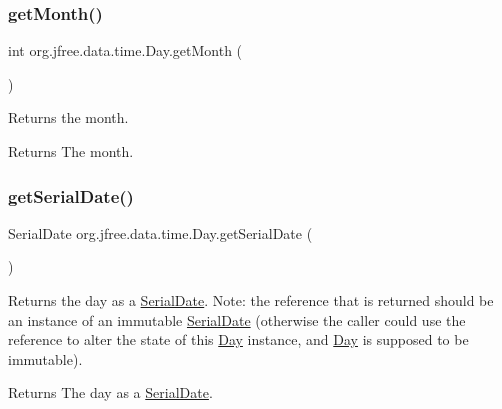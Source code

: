 \subsubsection{\texorpdfstring{get\+Month()}{getMonth()}}
{\footnotesize\ttfamily int org.\+jfree.\+data.\+time.\+Day.\+get\+Month (\begin{DoxyParamCaption}{ }\end{DoxyParamCaption})}

Returns the month.

\begin{DoxyReturn}{Returns}
The month. 
\end{DoxyReturn}
\mbox{\label{classorg_1_1jfree_1_1data_1_1time_1_1_day_ac0ef35d82e39618743da8e898ef401d0}} 
\subsubsection{\texorpdfstring{get\+Serial\+Date()}{getSerialDate()}}
{\footnotesize\ttfamily Serial\+Date org.\+jfree.\+data.\+time.\+Day.\+get\+Serial\+Date (\begin{DoxyParamCaption}{ }\end{DoxyParamCaption})}

Returns the day as a \mbox{\hyperlink{}{Serial\+Date}}. Note\+: the reference that is returned should be an instance of an immutable \mbox{\hyperlink{}{Serial\+Date}} (otherwise the caller could use the reference to alter the state of this {\ttfamily \mbox{\hyperlink{classorg_1_1jfree_1_1data_1_1time_1_1_day}{Day}}} instance, and {\ttfamily \mbox{\hyperlink{classorg_1_1jfree_1_1data_1_1time_1_1_day}{Day}}} is supposed to be immutable).

\begin{DoxyReturn}{Returns}
The day as a \mbox{\hyperlink{}{Serial\+Date}}. 
\end{DoxyReturn}
\mbox{\label{classorg_1_1jfree_1_1data_1_1time_1_1_day_ad4ca0021935416cd8b1d2b9d92f1f626}} 
